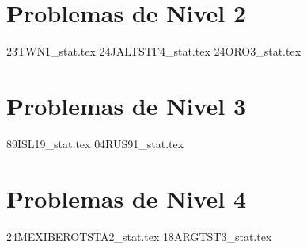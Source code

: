 \section{Problemas de Nivel 2}
{23TWN1_stat.tex} %
{24JALTSTF4_stat.tex} %
{24ORO3_stat.tex} %

\section{Problemas de Nivel 3}
{89ISL19_stat.tex} %
{04RUS91_stat.tex} %

\section{Problemas de Nivel 4}
{24MEXIBEROTSTA2_stat.tex} %
{18ARGTST3_stat.tex}%